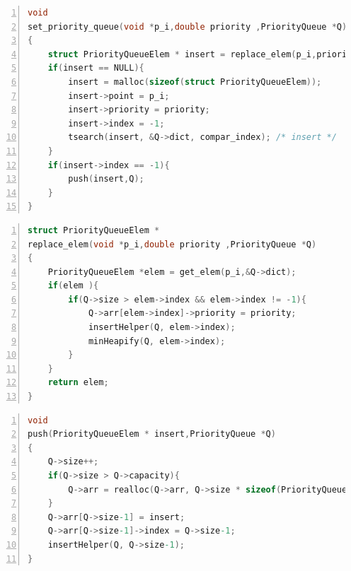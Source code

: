 \begin{lstlisting}[float=ht,language=C, % Spécifie le langage du code
caption={C code implementation of the PriorityQueue's Set Priority function.}, % Légende du listing
label=lst:prqueueMethodSet_c_s, % Étiquette pour référencer le listing
numbers=left,
numberstyle=\tiny\color{gray},
stepnumber=1,
frame=single,
breaklines=true,
postbreak=\mbox{\textcolor{red}{$\hookrightarrow$}\space},
showstringspaces=false
]
void
set_priority_queue(void *p_i,double priority ,PriorityQueue *Q)
{
	struct PriorityQueueElem * insert = replace_elem(p_i,priority,Q);
	if(insert == NULL){
		insert = malloc(sizeof(struct PriorityQueueElem));
		insert->point = p_i;
		insert->priority = priority;
		insert->index = -1;
		tsearch(insert, &Q->dict, compar_index); /* insert */
	}
	if(insert->index == -1){
		push(insert,Q);
	}
}
\end{lstlisting}

\begin{lstlisting}[float=ht,language=C, % Spécifie le langage du code
caption={C code implementation of the PriorityQueue's Replace elem function.}, % Légende du listing
label=lst:prqueueMethodSet_c_r, % Étiquette pour référencer le listing
numbers=left,
numberstyle=\tiny\color{gray},
stepnumber=1,
frame=single,
breaklines=true,
postbreak=\mbox{\textcolor{red}{$\hookrightarrow$}\space},
showstringspaces=false
]
struct PriorityQueueElem *
replace_elem(void *p_i,double priority ,PriorityQueue *Q)
{
	PriorityQueueElem *elem = get_elem(p_i,&Q->dict);
	if(elem ){
		if(Q->size > elem->index && elem->index != -1){
			Q->arr[elem->index]->priority = priority;
			insertHelper(Q, elem->index);
			minHeapify(Q, elem->index);
		}
	}
	return elem;
}
\end{lstlisting}

\begin{lstlisting}[float=ht,language=C, % Spécifie le langage du code
caption={C code implementation of the PriorityQueue's Push function.}, % Légende du listing
label=lst:prqueueMethodSet_c, % Étiquette pour référencer le listing
numbers=left,
numberstyle=\tiny\color{gray},
stepnumber=1,
frame=single,
breaklines=true,
postbreak=\mbox{\textcolor{red}{$\hookrightarrow$}\space},
showstringspaces=false
]
void
push(PriorityQueueElem * insert,PriorityQueue *Q)
{
	Q->size++;
	if(Q->size > Q->capacity){
		Q->arr = realloc(Q->arr, Q->size * sizeof(PriorityQueueElem*));
	}
	Q->arr[Q->size-1] = insert;
	Q->arr[Q->size-1]->index = Q->size-1;
	insertHelper(Q, Q->size-1);
}

\end{lstlisting}

